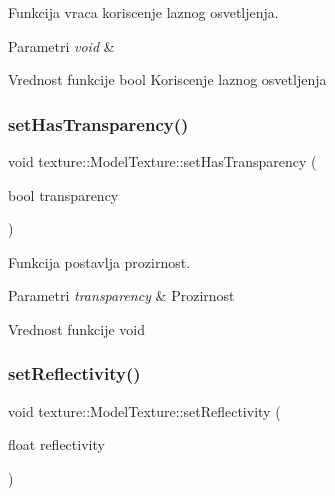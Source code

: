 Funkcija vraca koriscenje laznog osvetljenja. 


\begin{DoxyParams}{Parametri}
{\em void} & \\
\hline
\end{DoxyParams}
\begin{DoxyReturn}{Vrednost funkcije}
bool Koriscenje laznog osvetljenja 
\end{DoxyReturn}
\mbox{\label{classtexture_1_1ModelTexture_a04240906ba55ecaaec9a793788da9c58}} 
\subsubsection{\texorpdfstring{set\+Has\+Transparency()}{setHasTransparency()}}
{\footnotesize\ttfamily void texture\+::\+Model\+Texture\+::set\+Has\+Transparency (\begin{DoxyParamCaption}\item[{bool}]{transparency }\end{DoxyParamCaption})}



Funkcija postavlja prozirnost. 


\begin{DoxyParams}{Parametri}
{\em transparency} & Prozirnost \\
\hline
\end{DoxyParams}
\begin{DoxyReturn}{Vrednost funkcije}
void 
\end{DoxyReturn}
\mbox{\label{classtexture_1_1ModelTexture_a87d88c1857f107c1169b24d1488f5cbc}} 
\subsubsection{\texorpdfstring{set\+Reflectivity()}{setReflectivity()}}
{\footnotesize\ttfamily void texture\+::\+Model\+Texture\+::set\+Reflectivity (\begin{DoxyParamCaption}\item[{float}]{reflectivity }\end{DoxyParamCaption})}



